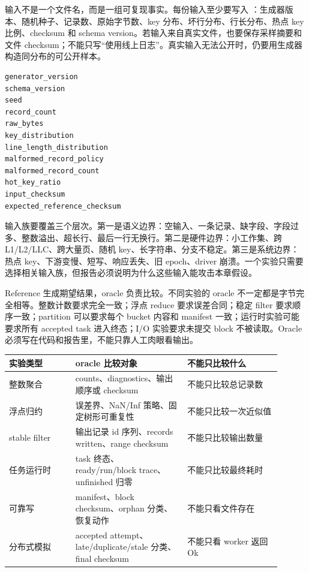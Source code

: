 输入不是一个文件名，而是一组可复现事实。每份输入至少要写入 ：生成器版本、随机种子、记录数、原始字节数、key 分布、坏行分布、行长分布、热点 key 比例、checksum 和 schema version。若输入来自真实文件，也要保存采样摘要和文件 checksum；不能只写“使用线上日志”。真实输入无法公开时，仍要用生成器构造同分布的可公开样本。

\begin{lstlisting}[numbers=none,caption={input.json 的最小字段}]
generator_version
schema_version
seed
record_count
raw_bytes
key_distribution
line_length_distribution
malformed_record_policy
malformed_record_count
hot_key_ratio
input_checksum
expected_reference_checksum
\end{lstlisting}

输入族要覆盖三个层次。第一是语义边界：空输入、一条记录、缺字段、字段过多、整数溢出、超长行、最后一行无换行。第二是硬件边界：小工作集、跨 L1/L2/LLC、跨大量页、随机 key、长字符串、分支不稳定。第三是系统边界：热点 key、下游变慢、短写、响应丢失、旧 epoch、driver 崩溃。一个实验只需要选择相关输入族，但报告必须说明为什么这些输入能攻击本章假设。

Reference 生成期望结果，oracle 负责比较。不同实验的 oracle 不一定都是字节完全相等。整数计数要求完全一致；浮点 reduce 要求误差合同；稳定 filter 要求顺序一致；partition 可以要求每个 bucket 内容和 manifest 一致；运行时实验可能要求所有 accepted task 进入终态；I/O 实验要求未提交 block 不被读取。Oracle 必须写在代码和报告里，不能只靠人工肉眼看输出。

\begin{center}
\small
\begin{tabular}{@{}p{0.22\linewidth}p{0.37\linewidth}p{0.31\linewidth}@{}}
\toprule
实验类型 & oracle 比较对象 & 不能只比较什么 \\
\midrule
整数聚合 & counts、diagnostics、输出顺序或 checksum & 不能只比较总记录数 \\
浮点归约 & 误差界、NaN/Inf 策略、固定树形可重复性 & 不能只比较一次近似值 \\
stable filter & 输出记录 id 序列、records written、range checksum & 不能只比较输出数量 \\
任务运行时 & task 终态、ready/run/block trace、unfinished 归零 & 不能只比较最终耗时 \\
可靠写 & manifest、block checksum、orphan 分类、恢复动作 & 不能只看文件存在 \\
分布式模拟 & accepted attempt、late/duplicate/stale 分类、final checksum & 不能只看 worker 返回 Ok \\
\bottomrule
\end{tabular}
\end{center}

